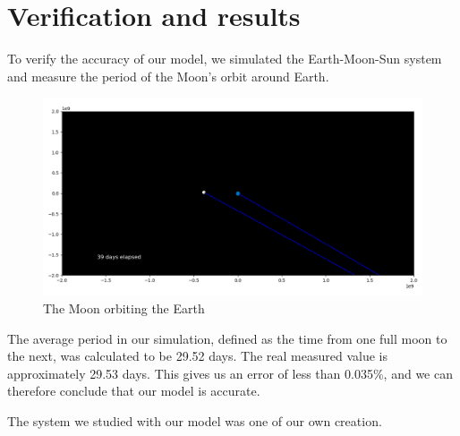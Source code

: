 \documentclass[12pt]{article}
\begin{document}
\section{Verification and results}
To verify the accuracy of our model, we simulated the Earth-Moon-Sun system and measure the period of the Moon's orbit around Earth. 
\begin{figure}[ht]
    \centering
    \includegraphics[width=\textwidth]{sem}
    \caption{The Moon orbiting the Earth}
\end{figure}
The average period in our simulation, defined as the time from one full moon to the next, was calculated to be 29.52 days. The real measured value is approximately 29.53 days. This gives us an error of less than 0.035\%, and we can therefore conclude that our model is accurate.

The system we studied with our model was one of our own creation. 
\end{document}
